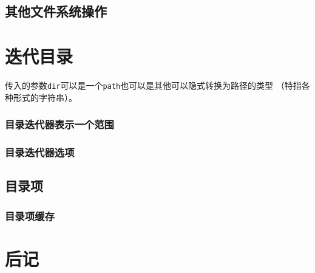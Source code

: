 \subsection{其他文件系统操作}\label{ch20.4.6}


\section{迭代目录}

传入的参数\texttt{dir}可以是一个\texttt{path}也可以是其他可以隐式转换为路径的类型
（特指各种形式的字符串）。\label{迭代.}

\subsubsection{目录迭代器表示一个范围}

\subsubsection{目录迭代器选项}

\subsection{目录项}

\subsubsection{目录项缓存}


\section{后记}